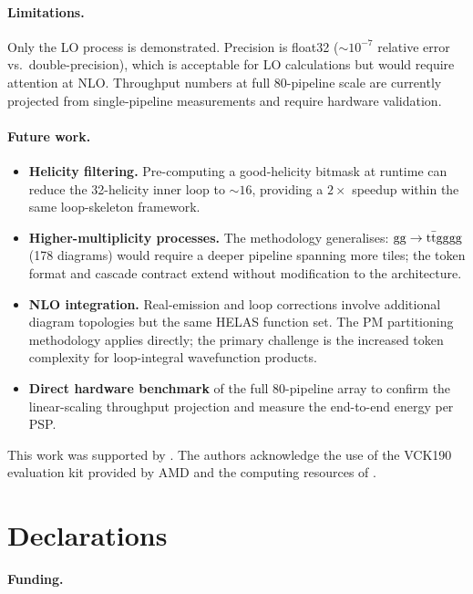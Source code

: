 \paragraph{Limitations.}
Only the LO \ggttg process is demonstrated.  Precision is float32
(${\sim}10^{-7}$ relative error vs.\ double-precision), which is acceptable for
LO calculations but would require attention at NLO.  Throughput numbers at
full 80-pipeline scale are currently projected from single-pipeline measurements
and require hardware validation.

\paragraph{Future work.}
\begin{itemize}
  \item \textbf{Helicity filtering.}  Pre-computing a good-helicity bitmask
    at runtime can reduce the 32-helicity inner loop to ${\sim}16$, providing
    a $2\times$ speedup within the same loop-skeleton framework.
  \item \textbf{Higher-multiplicity processes.}  The methodology generalises:
    $\mathrm{gg}\to\mathrm{t}\bar{\mathrm{t}}\mathrm{gg}\mathrm{gg}$ (178 diagrams) would require a deeper
    pipeline spanning more tiles; the token format and cascade contract extend
    without modification to the architecture.
  \item \textbf{NLO integration.}  Real-emission and loop corrections involve
    additional diagram topologies but the same HELAS function set.  The PM
    partitioning methodology applies directly; the primary challenge is the
    increased token complexity for loop-integral wavefunction products.
  \item \textbf{Direct hardware benchmark} of the full 80-pipeline array to
    confirm the linear-scaling throughput projection and measure the
    end-to-end energy per PSP.
\end{itemize}

\backmatter

This work was supported by .
The authors acknowledge the use of the VCK190 evaluation kit provided by AMD
and the computing resources of .

\section*{Declarations}

\noindent\textbf{Funding.}

